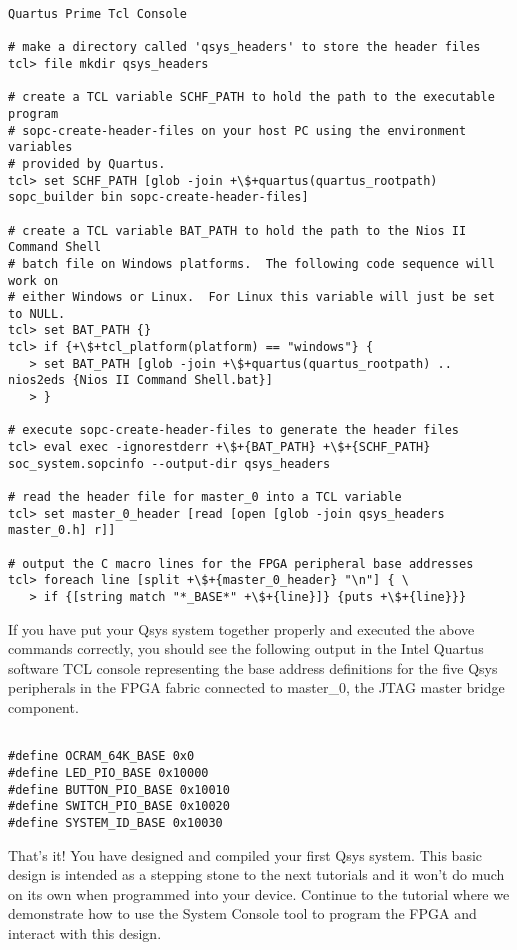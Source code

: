 \begin{flushleft}
\begin{enumerate}[
	label=\textbf{Step \arabic*.},
	leftmargin=*,
	widest={00},
	align=left]
\begin{verbatim}
Quartus Prime Tcl Console

# make a directory called 'qsys_headers' to store the header files
tcl> file mkdir qsys_headers

# create a TCL variable SCHF_PATH to hold the path to the executable program
# sopc-create-header-files on your host PC using the environment variables
# provided by Quartus.
tcl> set SCHF_PATH [glob -join +\$+quartus(quartus_rootpath) sopc_builder bin sopc-create-header-files]

# create a TCL variable BAT_PATH to hold the path to the Nios II Command Shell
# batch file on Windows platforms.  The following code sequence will work on
# either Windows or Linux.  For Linux this variable will just be set to NULL.
tcl> set BAT_PATH {}
tcl> if {+\$+tcl_platform(platform) == "windows"} {
   > set BAT_PATH [glob -join +\$+quartus(quartus_rootpath) .. nios2eds {Nios II Command Shell.bat}]
   > }

# execute sopc-create-header-files to generate the header files
tcl> eval exec -ignorestderr +\$+{BAT_PATH} +\$+{SCHF_PATH} soc_system.sopcinfo --output-dir qsys_headers

# read the header file for master_0 into a TCL variable
tcl> set master_0_header [read [open [glob -join qsys_headers master_0.h] r]]

# output the C macro lines for the FPGA peripheral base addresses
tcl> foreach line [split +\$+{master_0_header} "\n"] { \
   > if {[string match "*_BASE*" +\$+{line}]} {puts +\$+{line}}}

\end{verbatim}

If you have put your Qsys system together properly and executed the above commands correctly, you should see the following output in the Intel Quartus software TCL console representing the base address definitions for the five Qsys peripherals in the FPGA fabric connected to master\_0, the JTAG master bridge component.

\begin{verbatim}

#define OCRAM_64K_BASE 0x0
#define LED_PIO_BASE 0x10000
#define BUTTON_PIO_BASE 0x10010
#define SWITCH_PIO_BASE 0x10020
#define SYSTEM_ID_BASE 0x10030

\end{verbatim}

\end{enumerate}

That's it! You have designed and compiled your first Qsys system.  This basic design is intended as a stepping stone to the next tutorials and it won't do much on its own when programmed into your device. Continue to the  tutorial where we demonstrate how to use the System Console tool to program the FPGA and interact with this design.

\end{flushleft}



